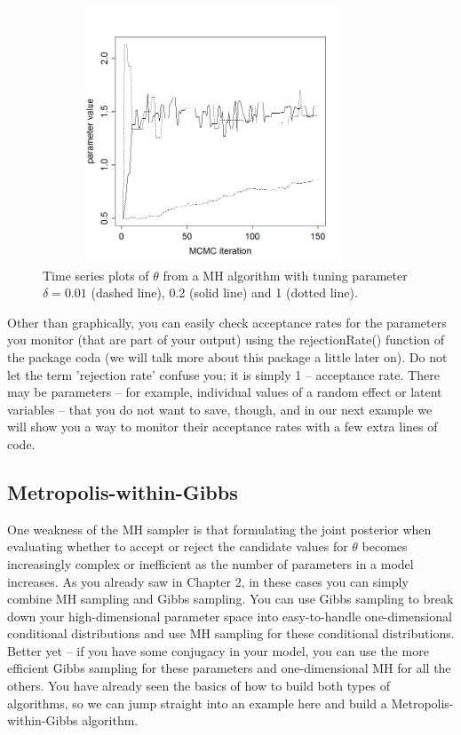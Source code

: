  \begin{figure}
\begin{center}
\includegraphics[height=3in,width=4in]{Ch6/figs/tuning}
\end{center}
\caption{Time series plots of $\theta$ from a MH algorithm with tuning parameter  $\delta = 0.01$ (dashed line), 0.2 (solid line) and  1 (dotted line).}
\label{mcmc.fig.tuning}
\end{figure}

Other than graphically, you can easily check acceptance rates for the parameters you monitor (that are part of your output) using the rejectionRate() function of the package coda (we will talk more about this package a little later on). Do not let the term 'rejection rate' confuse you; it is simply 1 -- acceptance rate. There may be parameters – for example, individual values of a random effect or latent variables – that you do not want to save, though, and in our next example we will show you a way to monitor their acceptance rates with a few extra lines of code.



\subsection{ Metropolis-within-Gibbs }

One weakness of the MH sampler is that formulating the joint posterior when evaluating whether to accept or reject the candidate values for $\theta$ becomes increasingly complex or inefficient as the number of parameters in a model increases. As you already saw in Chapter 2, in these cases you can simply combine MH sampling and Gibbs sampling. You can use Gibbs sampling to break down your high-dimensional parameter space into easy-to-handle one-dimensional conditional distributions and use MH sampling for these conditional distributions. Better yet – if you have some conjugacy in your model, you can use the more efficient Gibbs sampling for these parameters and one-dimensional MH for all the others. You have already seen the basics of how to build both types of algorithms, so we can jump straight into an example here and build a Metropolis-within-Gibbs algorithm.

